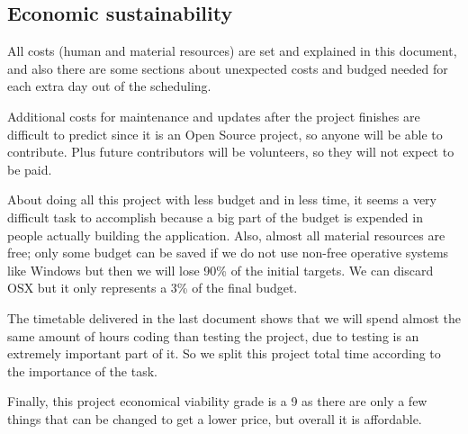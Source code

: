 \subsection{Economic sustainability}
All costs (human and material resources) are set and explained in this document, and also there are some sections about unexpected costs and budged needed for each extra day out of the scheduling.

Additional costs for maintenance and updates after the project finishes are difficult to predict since it is an Open Source project, so anyone will be able to contribute. Plus future contributors will be volunteers, so they will not expect to be paid.

About doing all this project with less budget and in less time, it seems a very difficult task to accomplish because a big part of the budget is expended in people actually building the application. Also, almost all material resources are free; only some budget can be saved if we do not use non-free operative systems like Windows but then we will lose 90\% of the initial targets. We can discard OSX but it only represents a 3\% of the final budget. 

The timetable delivered in the last document shows that we will spend almost the same amount of hours coding than testing the project, due to testing is an extremely important part of it. So we split this project total time according to the importance of the task. 

Finally, this project economical viability grade is a 9 as there are only a few things that can be changed to get a lower price, but overall it is affordable.